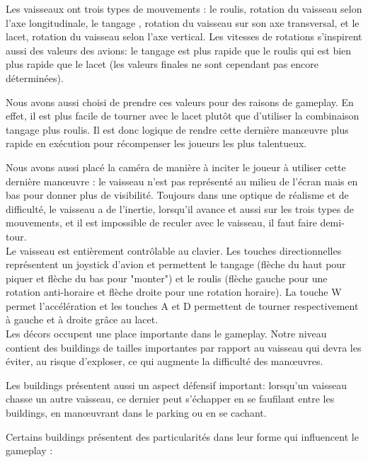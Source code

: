 \documentclass[10pt, titlepage]{report}
\begin{document}
 Les vaisseaux ont trois types de mouvements : le roulis, rotation du vaisseau selon l'axe longitudinale, le tangage , rotation du vaisseau sur son axe transversal, et le lacet, rotation du vaisseau selon l'axe vertical. Les vitesses de rotations s'inspirent aussi des valeurs des avions: le tangage est plus rapide que le roulis qui est bien plus rapide que le lacet (les valeurs finales ne sont cependant pas encore déterminées).

 Nous avons aussi choisi de prendre ces valeurs pour des raisons de gameplay. En effet, il est plus facile de tourner avec le lacet plutôt que d'utiliser la combinaison tangage plus roulis. Il est donc logique de rendre cette dernière manœuvre plus rapide en exécution pour récompenser les joueurs les plus talentueux.

 Nous avons aussi placé la caméra de manière à inciter le joueur à utiliser cette dernière manœuvre : le vaisseau n'est pas représenté au milieu de l'écran mais en bas pour donner plus de visibilité. Toujours dans une optique de réalisme et de difficulté, le vaisseau a de l'inertie, lorsqu'il avance et aussi sur les trois types de mouvements, et il est impossible de reculer avec le vaisseau, il faut faire demi-tour.\\

Le vaisseau est entièrement contrôlable au clavier. Les touches directionnelles représentent un joystick d'avion et permettent le tangage (flèche du haut pour piquer et flèche du bas pour "monter") et le roulis (flèche gauche pour une rotation anti-horaire et flèche droite pour une rotation horaire). La touche W permet l'accélération et les touches A et D permettent de tourner respectivement à gauche et à droite grâce au lacet.\\

Les décors occupent une place importante dans le gameplay. Notre niveau contient des buildings de tailles importantes par rapport au vaisseau qui devra les éviter, au risque d'exploser, ce qui augmente la difficulté des manœuvres.

Les buildings présentent aussi un aspect défensif important: lorsqu'un vaisseau chasse un autre vaisseau, ce dernier peut s'échapper en se faufilant entre les buildings, en manœuvrant dans le parking ou en se cachant.

Certains buildings présentent des particularités dans leur forme qui influencent le gameplay : 
\end{document}
